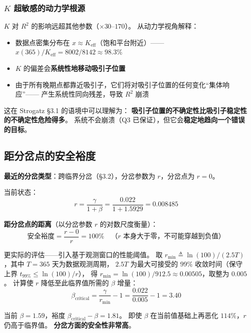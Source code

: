 \documentclass[12pt,a4paper]{article}
\begin{document}
\subsubsection{$K$ 超敏感的动力学根源}
$K$ 对 $R^2$ 的影响远超其他参数（$\times 30$--$170$）。
从动力学视角解释：
\begin{itemize}
  \item 数据点密集分布在 $x \approx K_{\text{eff}}$（饱和平台附近）——
        $x(365) / K_{\text{eff}} = 8002 / 8142 \approx 98.3\%$
  \item $K$ 的偏差会\textbf{系统性地移动吸引子位置}
  \item 由于所有晚期点都靠近吸引子，它们将对吸引子位置的任何变化``集体响应''——
        产生系统性同向残差，导致 $R^2$ 崩溃
\end{itemize}

这在 Strogatz \S3.1 的语境中可以理解为：
\textbf{吸引子位置的不确定性比吸引子稳定性的不确定性危险得多}。
系统不会崩溃（Q3 已保证），但它会\textbf{稳定地趋向一个错误的目标}。

\subsection{距分岔点的安全裕度}

\textbf{最近的分岔类型}：跨临界分岔（\S3.2），分岔参数为 $r$，分岔点为 $r = 0$。

当前状态：
\begin{equation}
r = \frac{\gamma}{1+\beta} = \frac{0.022}{1+1.5929} = 0.008485
\end{equation}

\textbf{距分岔点的距离}（以分岔参数 $r$ 的对数尺度衡量）：
\begin{equation}
\text{安全裕度} = \frac{r - 0}{r} = 100\% \quad \text{（$r$ 本身大于零，不可能穿越到负值）}
\end{equation}

更实际的评估——引入基于观测窗口的性能阈值。
取 $r_{\min} \triangleq \ln(100)/(2.5T)$，其中 $T = 365$ 天为数据观测周期，
$2.5T$ 为最大可接受的 $99\%$ 收敛时间（保守上界 $t_{99\%} \leq \ln(100)/r$），
得 $r_{\min} = \ln(100)/912.5 \approx 0.00505$，取整为 $0.005$。
计算使 $r$ 降低至此临界值所需的 $\beta$ 增量：
\begin{equation}
\beta_{\text{critical}} = \frac{\gamma}{r_{\min}} - 1 = \frac{0.022}{0.005} - 1 = 3.40
\end{equation}

当前 $\beta = 1.59$，裕度 $\beta_{\text{critical}} - \beta = 1.81$。
即使 $\beta$ 在当前值基础上再恶化 $114\%$，$r$ 仍高于临界值。
\textbf{分岔方面的安全性非常高}。
\end{document}
